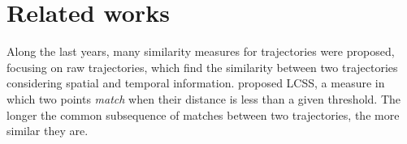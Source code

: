 \documentclass[12pt]{article}
\begin{document}




\section{Related works} \label{sec:related}
Along the last years, many similarity measures for trajectories were proposed, focusing on raw trajectories, which find the similarity between two trajectories considering spatial and temporal information. \cite{vlachos2002discovering} proposed LCSS, a measure in which two points \textit{match} when their distance is less than a given threshold. The longer the common subsequence of matches between two trajectories, the more similar they are.
\end{document}
